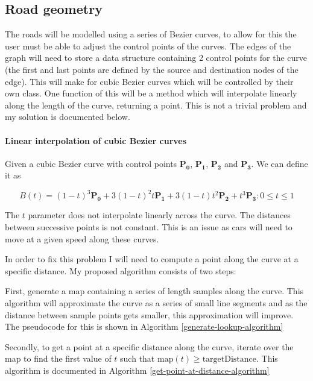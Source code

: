     \subsection{Road geometry}

    The roads will be modelled using a series of Bezier curves, to allow for this the user must be able to adjust the control points of the curves. The edges of the graph will need to store a data structure containing 2 control points for the curve (the first and last points are defined by the source and destination nodes of the edge). This will make for cubic Bezier curves which will be controlled by their own  class. One function of this will be a  method which will interpolate linearly along the length of the curve, returning a point. This is not a trivial problem and my solution is documented below.

    \paragraph{Linear interpolation of cubic Bezier curves}

    Given a cubic Bezier curve with control points $\mathbf{P_0}$, $\mathbf{P_1}$, $\mathbf{P_2}$ and $\mathbf{P_3}$. We can define it as

    \[B(t) = (1 - t)^3\mathbf{P_0} + 3(1 - t)^2t\mathbf{P_1} + 3(1 - t)t^2\mathbf{P_2} + t^3\mathbf{P_3} : 0 \leq t \leq 1\]

    The $t$ parameter does not interpolate linearly across the curve. The distances between successive points is not constant. This is an issue as cars will need to move at a given speed along these curves.

    In order to fix this problem I will need to compute a point along the curve at a specific distance. My proposed algorithm consists of two steps:

    First, generate a map containing a series of length samples along the curve. This algorithm will approximate the curve as a series of small line segments and as the distance between sample points gets smaller, this approximation will improve. The pseudocode for this is shown in Algorithm \ref{generate-lookup-algorithm}

    Secondly, to get a point at a specific distance along the curve, iterate over the map to find the first value of $t$ such that $\text{map}(t) \geq \text{targetDistance}$. This algorithm is documented in Algorithm \ref{get-point-at-distance-algorithm}

